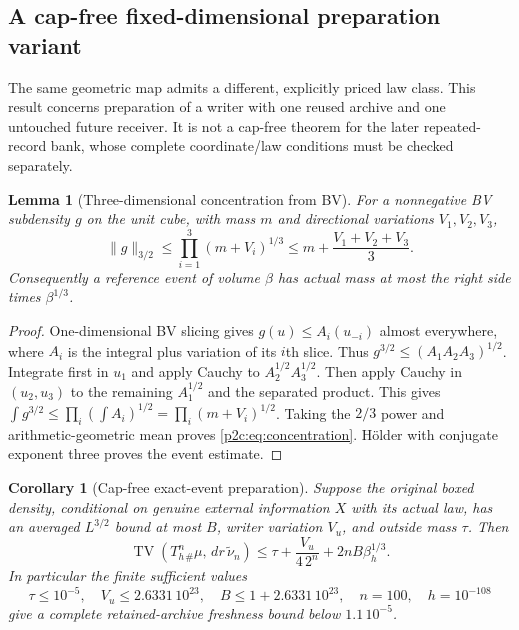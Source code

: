 \documentclass[11pt]{article}
\numberwithin{equation}{section}
\newtheorem{lemma}[theorem]{Lemma}
\newtheorem{corollary}[theorem]{Corollary}
\theoremstyle{definition}
\theoremstyle{remark}
\begin{document}
\subsection{A cap-free fixed-dimensional preparation variant}

The same geometric map admits a different, explicitly
priced law class. This result concerns preparation
of a writer with one reused archive and one untouched
future receiver. It is not a cap-free theorem for
the later repeated-record bank, whose complete
coordinate/law conditions must be checked separately.

\begin{lemma}[Three-dimensional concentration from BV]
\label{p2c:lem:concentration}
For a nonnegative BV subdensity $g$ on the unit cube,
with mass $m$ and directional variations $V_1,V_2,V_3$,
\begin{equation}\label{p2c:eq:concentration}
 \|g\|_{3/2}\leq
       \prod_{i=1}^3(m+V_i)^{1/3}
       \leq m+\frac{V_1+V_2+V_3}{3}.
\end{equation}
Consequently a reference event of volume $\beta$
has actual mass at most the right side times
$\beta^{1/3}$.
\end{lemma}

\begin{proof}
One-dimensional BV slicing gives
$g(u)\leq A_i(u_{-i})$ almost everywhere, where
$A_i$ is the integral plus variation of its $i$th
slice. Thus $g^{3/2}\leq(A_1A_2A_3)^{1/2}$.
Integrate first in $u_1$ and apply Cauchy to
$A_2^{1/2}A_3^{1/2}$. Then apply Cauchy in
$(u_2,u_3)$ to the remaining $A_1^{1/2}$ and
the separated product. This gives
$\int g^{3/2}\leq\prod_i(\int A_i)^{1/2}
=\prod_i(m+V_i)^{1/2}$.
Taking the $2/3$ power and arithmetic-geometric
mean proves \eqref{p2c:eq:concentration}.
H\"older with conjugate exponent three proves
the event estimate.
\end{proof}

\begin{corollary}[Cap-free exact-event preparation]\label{p2c:cor:capfree}
Suppose the original boxed density, conditional on
genuine external information $X$ with its actual
law, has an averaged $L^{3/2}$ bound at most $B$,
writer variation $V_u$, and outside mass $\tau$.
Then
\begin{equation}\label{p2c:eq:capfree}
 \operatorname{TV}(T_h^n{}_\#\mu,\,
                      dr\,\widetilde\nu_n)
 \leq\tau+\frac{V_u}{4\,2^n}
                        +2nB\beta_h^{1/3}.
\end{equation}
In particular the finite sufficient values
\[
 \tau\leq10^{-5},\quad V_u\leq2.6331\,10^{23},
 \quad B\leq1+2.6331\,10^{23},\quad
 n=100,\quad h=10^{-108}
\]
give a complete retained-archive freshness bound
below $1.1\,10^{-5}$.
\end{corollary}
\end{document}
